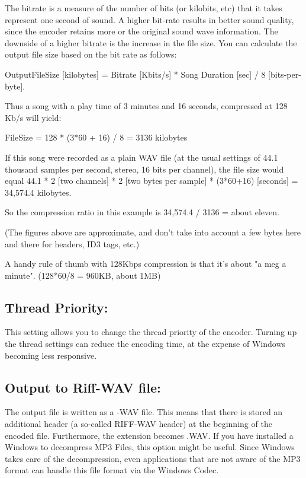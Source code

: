 The bitrate is a measure of the number of bits (or kilobits, etc) that it takes represent one second of sound.
A higher bit-rate results in better
sound quality, since the encoder retains more or the original sound wave information.
The downside of a higher bitrate is the increase in the file size. You can calculate
the output file size based on the bit rate as follows:

OutputFileSize [kilobytes] = Bitrate [Kbits/s] * Song Duration [sec] / 8 [bits-per-byte].

Thus a song with a play time of 3 minutes and 16 seconds, compressed at 128 Kb/s will yield:

FileSize = 128 * (3*60 + 16) / 8 = 3136 kilobytes

If this song were recorded as a plain WAV file (at the usual settings
of 44.1 thousand samples per second, stereo, 16 bits per channel),
the file size would equal 44.1 * 2 [two channels] * 2 [two bytes per sample]
* (3*60+16) [seconds] = 34,574.4 kilobytes.

So the compression ratio  in this example is
34,574.4 / 3136 = about eleven.

(The figures above are approximate, and don't take into account a few bytes here
and there for headers, ID3 tags, etc.)

A handy rule of thumb with 128Kbps compression is that it's
about "a meg a minute".  (128*60/8 = 960KB, about 1MB)


\subsection{Thread Priority:}

This setting allows you to change the thread priority of the encoder.
Turning up the thread settings can reduce the encoding time, at the expense
of Windows becoming less responsive.


\subsection{Output to Riff-WAV file:}\label{riffwavlabel}

The output file is written as a -WAV file. This means that there is stored
an additional header (a so-called RIFF-WAV header) at the beginning of the
encoded file.  Furthermore, the extension becomes .WAV.  If you have
installed a Windows  to decompress MP3 Files, this option might be
useful. Since Windows takes care of the decompression, even applications that
are not aware of the MP3 format can handle this file format via the Windows Codec.


